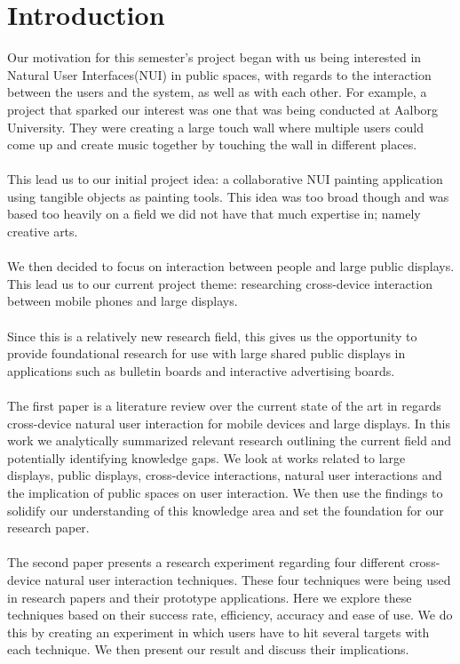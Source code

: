 \section*{Introduction}

Our motivation for this semester's project began with us being interested in Natural User Interfaces(NUI) in public spaces, with regards to the interaction between the users and the system, as well as with each other.
For example, a project that sparked our interest was one that was being conducted at Aalborg University. 
They were creating a large touch wall where multiple users could come up and create music together by touching the wall in different places. \\\\
This lead us to our initial project idea: a collaborative NUI painting application using tangible objects as painting tools. This idea was too broad though and was based too heavily on a field we did not have that much expertise in; namely creative arts.\\\\
We then decided to focus on interaction between people and large public displays. This lead us to our current project theme: researching cross-device interaction between mobile phones and large displays. \\\\
Since this is a relatively new research field, this gives us the opportunity to provide foundational research for use with large shared public displays in applications such as bulletin boards and interactive advertising boards.\\\\
The first paper is a literature review over the current state of the art in regards cross-device natural user interaction for mobile devices and large displays. In this work we analytically summarized relevant research outlining the current field and potentially identifying knowledge gaps. We look at works related to large displays, public displays, cross-device interactions, natural user interactions and the implication of public spaces on user interaction. We then use the findings to solidify our understanding of this knowledge area and set the foundation for our research paper.  \\\\
The second paper presents a research experiment regarding four different cross-device natural user interaction techniques. These four techniques were being used in research papers and their prototype applications. Here we explore these techniques based on their success rate, efficiency, accuracy and ease of use. We do this by creating an experiment in which users have to hit several targets with each technique. We then present our result and discuss their implications.